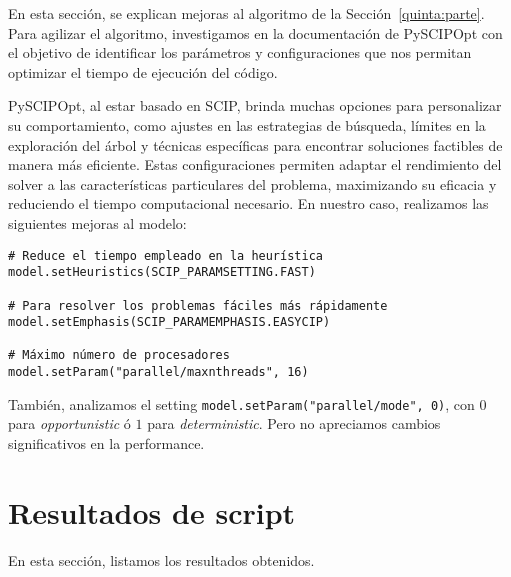 \documentclass[11pt, a4paper, pdftex]{article}
\begin{document}
En esta sección, se explican mejoras al algoritmo de la
Sección~\ref{quinta:parte}. Para agilizar el algoritmo, investigamos en la
documentación de PySCIPOpt con el objetivo de identificar los parámetros y
configuraciones que nos permitan optimizar el tiempo de ejecución del
código.

PySCIPOpt, al estar basado en SCIP, brinda muchas opciones para
personalizar su comportamiento, como ajustes en las estrategias de
búsqueda, límites en la exploración del árbol y técnicas específicas
para encontrar soluciones factibles de manera más eficiente. Estas
configuraciones permiten adaptar el rendimiento del solver a las
características particulares del problema, maximizando su eficacia y
reduciendo el tiempo computacional necesario. En nuestro caso,
realizamos las siguientes mejoras al modelo:

\begin{verbatim}
# Reduce el tiempo empleado en la heurística
model.setHeuristics(SCIP_PARAMSETTING.FAST)

# Para resolver los problemas fáciles más rápidamente
model.setEmphasis(SCIP_PARAMEMPHASIS.EASYCIP)

# Máximo número de procesadores
model.setParam("parallel/maxnthreads", 16)
\end{verbatim}

También, analizamos el setting \verb|model.setParam("parallel/mode", 0)|,
con $0$ para \emph{opportunistic} ó $1$ para \emph{deterministic}.
Pero no apreciamos cambios significativos en la performance.

\newpage

\section{Resultados de script}

En esta sección, listamos los resultados obtenidos.
\end{document}
